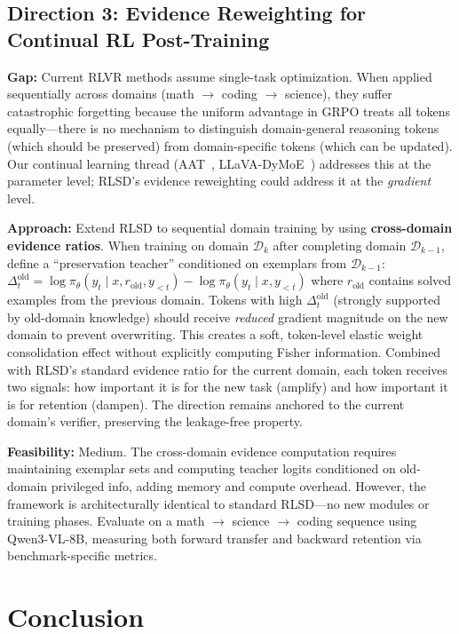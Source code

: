 \documentclass[11pt]{article}
\begin{document}
\subsection{Direction 3: Evidence Reweighting for Continual RL Post-Training}

\textbf{Gap:} Current RLVR methods assume single-task optimization. When applied sequentially across domains (math $\to$ coding $\to$ science), they suffer catastrophic forgetting because the uniform advantage in GRPO treats all tokens equally---there is no mechanism to distinguish domain-general reasoning tokens (which should be preserved) from domain-specific tokens (which can be updated). Our continual learning thread (AAT~\cite{aat}, LLaVA-DyMoE~\cite{dymoe}) addresses this at the parameter level; RLSD's evidence reweighting could address it at the \textit{gradient} level.

\textbf{Approach:} Extend RLSD to sequential domain training by using \textbf{cross-domain evidence ratios}. When training on domain $\mathcal{D}_k$ after completing domain $\mathcal{D}_{k-1}$, define a ``preservation teacher'' conditioned on exemplars from $\mathcal{D}_{k-1}$: $\Delta_t^{\mathrm{old}} = \log \pi_\theta(y_t \mid x, r_{\mathrm{old}}, y_{<t}) - \log \pi_\theta(y_t \mid x, y_{<t})$ where $r_{\mathrm{old}}$ contains solved examples from the previous domain. Tokens with high $\Delta_t^{\mathrm{old}}$ (strongly supported by old-domain knowledge) should receive \textit{reduced} gradient magnitude on the new domain to prevent overwriting. This creates a soft, token-level elastic weight consolidation effect without explicitly computing Fisher information. Combined with RLSD's standard evidence ratio for the current domain, each token receives two signals: how important it is for the new task (amplify) and how important it is for retention (dampen). The direction remains anchored to the current domain's verifier, preserving the leakage-free property.

\textbf{Feasibility:} Medium. The cross-domain evidence computation requires maintaining exemplar sets and computing teacher logits conditioned on old-domain privileged info, adding memory and compute overhead. However, the framework is architecturally identical to standard RLSD---no new modules or training phases. Evaluate on a math $\to$ science $\to$ coding sequence using Qwen3-VL-8B, measuring both forward transfer and backward retention via benchmark-specific metrics.

\section{Conclusion}
\end{document}
